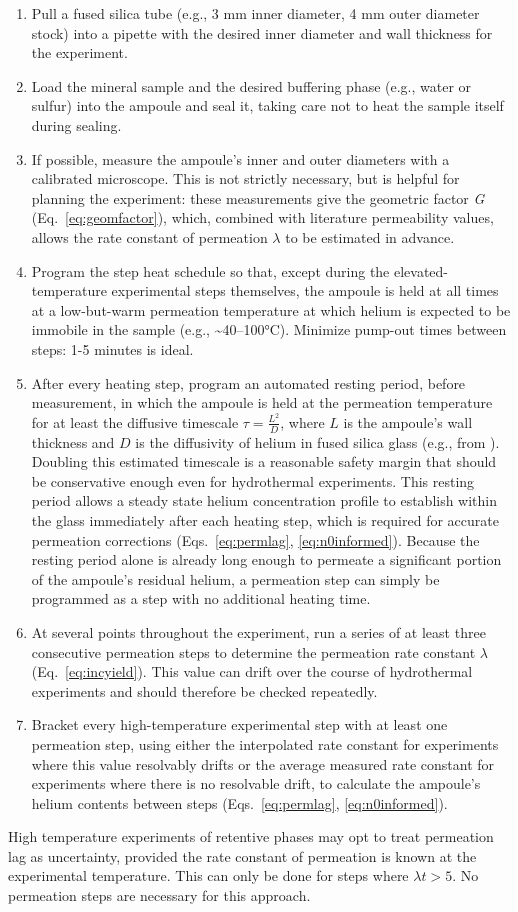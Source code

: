 \begin{enumerate}
  \item Pull a fused silica tube (e.g., 3 mm inner diameter, 4 mm outer diameter stock) into a pipette with the desired inner diameter and wall thickness for the experiment.
  \item Load the mineral sample and the desired buffering phase (e.g., water or sulfur) into the ampoule and seal it, taking care not to heat the sample itself during sealing.
  \item If possible, measure the ampoule's inner and outer diameters with a calibrated microscope. This is not strictly necessary, but is helpful for planning the experiment: these measurements give the geometric factor \emph{G} (Eq.~\eqref{eq:geomfactor}), which, combined with literature permeability values, allows the rate constant of permeation $\lambda$ to be estimated in advance.
  \item Program the step heat schedule so that, except during the elevated-temperature experimental steps themselves, the ampoule is held at all times at a low-but-warm permeation temperature at which helium is expected to be immobile in the sample (e.g., \textasciitilde40--100°C). Minimize pump-out times between steps: 1-5 minutes is ideal.
  \item After every heating step, program an automated resting period, before measurement, in which the ampoule is held at the permeation temperature for at least the diffusive timescale \(\tau = \frac{L^{2}}{D}\), where \(L\) is the ampoule's wall thickness and \(D\) is the diffusivity of helium in fused silica glass (e.g., from \citealp{swets1961}). Doubling this estimated timescale is a reasonable safety margin that should be conservative enough even for hydrothermal experiments. This resting period allows a steady state helium concentration profile to establish within the glass immediately after each heating step, which is required for accurate permeation corrections (Eqs.~\eqref{eq:permlag}, \eqref{eq:n0informed}). Because the resting period alone is already long enough to permeate a significant portion of the ampoule's residual helium, a permeation step can simply be programmed as a step with no additional heating time.
  \item At several points throughout the experiment, run a series of at least three consecutive permeation steps to determine the permeation rate constant $\lambda$ (Eq.~\eqref{eq:incyield}). This value can drift over the course of hydrothermal experiments and should therefore be checked repeatedly.
  \item Bracket every high-temperature experimental step with at least one permeation step, using either the interpolated rate constant for experiments where this value resolvably drifts or the average measured rate constant for experiments where there is no resolvable drift, to calculate the ampoule's helium contents between steps (Eqs.~\eqref{eq:permlag}, \eqref{eq:n0informed}).
\end{enumerate}

High temperature experiments of retentive phases may opt to treat permeation lag as uncertainty, provided the rate constant of permeation is known at the experimental temperature. This can only be done for steps where $\lambda t > 5$. No permeation steps are necessary for this approach.